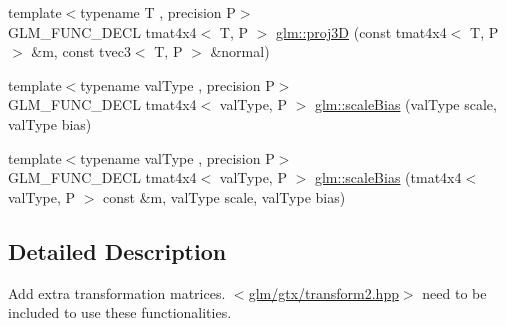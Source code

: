 \begin{DoxyCompactItemize}
\item 
{\footnotesize template$<$typename T , precision P$>$ }\\G\-L\-M\-\_\-\-F\-U\-N\-C\-\_\-\-D\-E\-C\-L tmat4x4$<$ T, P $>$ \hyperlink{group__gtx__transform2_gafab0418f2503ec2133cb2de828cc482a}{glm\-::proj3\-D} (const tmat4x4$<$ T, P $>$ \&m, const tvec3$<$ T, P $>$ \&normal)
\item 
{\footnotesize template$<$typename val\-Type , precision P$>$ }\\G\-L\-M\-\_\-\-F\-U\-N\-C\-\_\-\-D\-E\-C\-L tmat4x4$<$ val\-Type, P $>$ \hyperlink{group__gtx__transform2_ga2874abd228989556d610a0bff993667a}{glm\-::scale\-Bias} (val\-Type scale, val\-Type bias)
\item 
{\footnotesize template$<$typename val\-Type , precision P$>$ }\\G\-L\-M\-\_\-\-F\-U\-N\-C\-\_\-\-D\-E\-C\-L tmat4x4$<$ val\-Type, P $>$ \hyperlink{group__gtx__transform2_gac1a1139e2980021422d1fc1c42dc74f2}{glm\-::scale\-Bias} (tmat4x4$<$ val\-Type, P $>$ const \&m, val\-Type scale, val\-Type bias)
\end{DoxyCompactItemize}


\subsection{Detailed Description}
Add extra transformation matrices. $<$\hyperlink{transform2_8hpp}{glm/gtx/transform2.\-hpp}$>$ need to be included to use these functionalities. 

